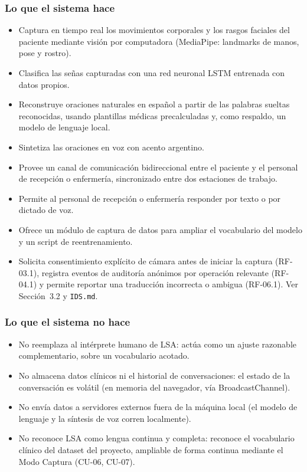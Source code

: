 \subsubsection{Lo que el sistema hace}
\begin{itemize}
    \item Captura en tiempo real los movimientos corporales y los rasgos
    faciales del paciente mediante visión por computadora (MediaPipe:
    landmarks de manos, pose y rostro).
    \item Clasifica las señas capturadas con una red neuronal LSTM
    entrenada con datos propios.
    \item Reconstruye oraciones naturales en español a partir de las
    palabras sueltas reconocidas, usando plantillas médicas precalculadas
    y, como respaldo, un modelo de lenguaje local.
    \item Sintetiza las oraciones en voz con acento argentino.
    \item Provee un canal de comunicación bidireccional entre el paciente
    y el personal de recepción o enfermería, sincronizado entre dos estaciones de trabajo.
    \item Permite al personal de recepción o enfermería responder por
    texto o por dictado de voz.
    \item Ofrece un módulo de captura de datos para ampliar el vocabulario
    del modelo y un script de reentrenamiento.
    \item Solicita consentimiento explícito de cámara antes de iniciar la
    captura (RF-03.1), registra eventos de auditoría anónimos por
    operación relevante (RF-04.1) y permite reportar una traducción
    incorrecta o ambigua (RF-06.1). Ver Sección~3.2 y \texttt{IDS.md}.
\end{itemize}

\subsubsection{Lo que el sistema no hace}
\begin{itemize}
    \item No reemplaza al intérprete humano de LSA: actúa como un ajuste
    razonable complementario, sobre un vocabulario acotado.
    \item No almacena datos clínicos ni el historial de conversaciones: el
    estado de la conversación es volátil (en memoria del navegador, vía
    BroadcastChannel).
    \item No envía datos a servidores externos fuera de la máquina local
    (el modelo de lenguaje y la síntesis de voz corren localmente).
    \item No reconoce LSA como lengua continua y completa: reconoce el
    vocabulario clínico del dataset del proyecto, ampliable de forma
    continua mediante el Modo Captura (CU-06, CU-07).
\end{itemize}

